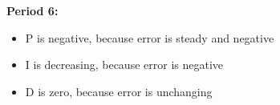 {\bf Period 6:}
 

\begin{itemize}
\item{}P is negative, because error is steady and negative
\item{}I is decreasing, because error is negative
\item{}D is zero, because error is unchanging
\end{itemize} 






